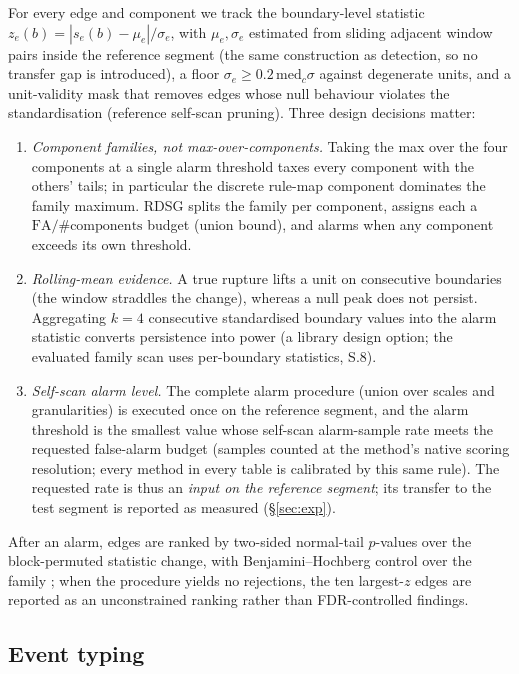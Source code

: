 \documentclass[11pt,a4paper]{article}
\newcommand{\RDSG}{RDSG}
\begin{document}
For every edge and component we track the boundary-level statistic
$z_e(b)=|s_e(b)-\mu_e|/\sigma_e$, with $\mu_e,\sigma_e$ estimated from
sliding adjacent window pairs inside the reference segment (the same
construction as detection, so no transfer gap is introduced), a floor
$\sigma_e\ge 0.2\,\mathrm{med}_c\sigma$ against degenerate units, and a
unit-validity mask that removes edges whose null behaviour violates the
standardisation (reference self-scan pruning). Three design decisions matter:
\begin{enumerate}
\itemsep2pt
\item \emph{Component families, not max-over-components.} Taking the max over the four components at a single alarm threshold taxes every component with the others' tails; in particular the discrete rule-map component dominates the family maximum. \RDSG{} splits the family per component, assigns each a $\mathrm{FA}/\#\mathrm{components}$ budget (union bound), and alarms when any component exceeds its own threshold.
\item \emph{Rolling-mean evidence.} A true rupture lifts a unit on consecutive boundaries (the window straddles the change), whereas a null peak does not persist. Aggregating $k=4$ consecutive standardised boundary values into the alarm statistic converts persistence into power (a library design option; the evaluated family scan uses per-boundary statistics, S.8).
\item \emph{Self-scan alarm level.} The complete alarm procedure (union over scales and granularities) is executed once on the reference segment, and the alarm threshold is the smallest value whose self-scan alarm-sample rate meets the requested false-alarm budget (samples counted at the method's native scoring resolution; every method in every table is calibrated by this same rule). The requested rate is thus an \emph{input on the reference segment}; its
transfer to the test segment is reported as measured (\S\ref{sec:exp}).
\end{enumerate}
After an alarm, edges are ranked by two-sided normal-tail $p$-values over
the block-permuted statistic change, with Benjamini--Hochberg control over
the family \citep{benjamini1995}; when the procedure yields no rejections,
the ten largest-$z$ edges are reported as an unconstrained ranking rather
than FDR-controlled findings.

\subsection{Event typing}\label{sec:typing}
\end{document}
